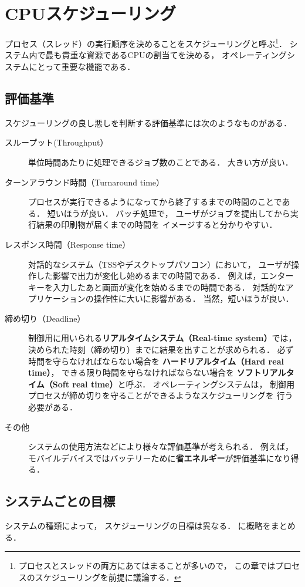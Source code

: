 \chapter{CPUスケジューリング}
プロセス（スレッド）の実行順序を決めることをスケジューリングと呼ぶ\footnote{
プロセスとスレッドの両方にあてはまることが多いので，
この章ではプロセスのスケジューリングを前提に議論する．}．
システム内で最も貴重な資源であるCPUの割当てを決める，
オペレーティングシステムにとって重要な機能である．

\section{評価基準}
スケジューリングの良し悪しを判断する評価基準には次のようなものがある．

\begin{description}
\item[スループット(Throughput）]
単位時間あたりに処理できるジョブ数のことである．
大きい方が良い．

\item[ターンアラウンド時間（Turnaround time）]
プロセスが実行できるようになってから終了するまでの時間のことである．
短いほうが良い．
バッチ処理で，
ユーザがジョブを提出してから実行結果の印刷物が届くまでの時間を
イメージすると分かりやすい．

\item[レスポンス時間（Response time）]
対話的なシステム（TSSやデスクトップパソコン）において，
ユーザが操作した影響で出力が変化し始めるまでの時間である．
例えば，エンターキーを入力したあと画面が変化を始めるまでの時間である．
対話的なアプリケーションの操作性に大いに影響がある．
当然，短いほうが良い．

\item[締め切り（Deadline）]
制御用に用いられる{\bf リアルタイムシステム（Real-time system）}では，
決められた時刻（締め切り）までに結果を出すことが求められる．
必ず時間を守らなければならない場合を
{\bf ハードリアルタイム（Hard real time）}，
できる限り時間を守らなければならない場合を
{\bf ソフトリアルタイム（Soft real time）}と呼ぶ．
オペレーティングシステムは，
制御用プロセスが締め切りを守ることができるようなスケジューリングを
行う必要がある．

\item[その他]
システムの使用方法などにより様々な評価基準が考えられる．
例えば，
モバイルデバイスではバッテリーために{\bf 省エネルギー}が評価基準になり得る．
\end{description}

\section{システムごとの目標}
システムの種類によって，
スケジューリングの目標は異なる．
に概略をまとめる．

